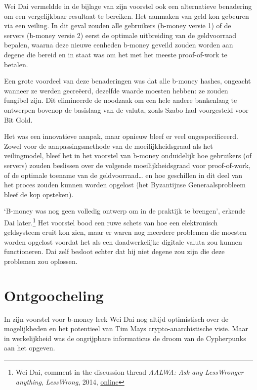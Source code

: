 \documentclass[
  a5paper,
  smalldemyvopaper,11pt,twoside,onecolumn,openright,extrafontsizes,
hidelinks]{memoir}
\begin{document}
Wei Dai vermeldde in de bijlage van zijn voorstel ook een alternatieve
benadering om een vergelijkbaar resultaat te bereiken. Het aanmaken van
geld kon gebeuren via een veiling. In dit geval zouden alle gebruikers
(b-money versie 1) of de servers (b-money versie 2) eerst de optimale
uitbreiding van de geldvoorraad bepalen, waarna deze nieuwe eenheden
b-money geveild zouden worden aan degene die bereid en in staat was om
het met het meeste proof-of-work te betalen.

Een grote voordeel van deze benaderingen was dat alle b-money hashes,
ongeacht wanneer ze werden gecreëerd, dezelfde waarde moesten hebben: ze
zouden fungibel zijn. Dit elimineerde de noodzaak om een hele andere
bankenlaag te ontwerpen bovenop de basislaag van de valuta, zoals Szabo
had voorgesteld voor Bit Gold.

Het was een innovatieve aanpak, maar opnieuw bleef er veel
ongespecificeerd. Zowel voor de aanpassingsmethode van de
moeilijkheidsgraad als het veilingmodel, bleef het in het voorstel van
b-money onduidelijk hoe gebruikers (of servers) zouden beslissen over de
volgende moeilijkheidsgraad voor proof-of-work, of de optimale toename
van de geldvoorraad\ldots{} en hoe geschillen in dit deel van het proces
zouden kunnen worden opgelost (het Byzantijnse Generaalsprobleem bleef
de kop opsteken).

`B-money was nog geen volledig ontwerp om in de praktijk te brengen',
erkende Dai later.\footnote{Wei Dai, comment in the discussion thread
  \emph{AALWA: Ask any LessWronger anything}, \emph{LessWrong}, 2014,
  \href{https://www.lesswrong.com/posts/YdfpDyRpNyypivgdu/aalwa-ask-any-lesswronger-anything}{online}}
Het voorstel bood een ruwe schets van hoe een elektronisch geldsysteem
eruit kon zien, maar er waren nog meerdere problemen die moesten worden
opgelost voordat het als een daadwerkelijke digitale valuta zou kunnen
functioneren. Dai zelf besloot echter dat hij niet degene zou zijn die
deze problemen zou oplossen.

\section{Ontgoocheling}\label{ontgoocheling}

In zijn voorstel voor b-money leek Wei Dai nog altijd optimistisch over
de mogelijkheden en het potentieel van Tim Mays crypto-anarchistische
visie. Maar in werkelijkheid was de ongrijpbare informaticus de droom
van de Cypherpunks aan het opgeven.
\end{document}
